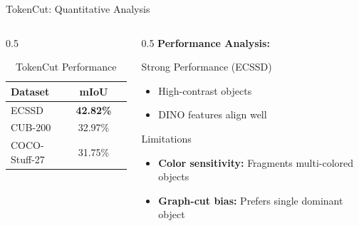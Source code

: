 \documentclass[aspectratio=169]{beamer}
\begin{document}
\begin{frame}{TokenCut: Quantitative Analysis}
\begin{columns}
\begin{column}{0.5\textwidth}
\begin{table}
\centering
\begin{tabular}{lcc}
\toprule
\textbf{Dataset} & \textbf{mIoU} \\
\midrule
ECSSD & \textbf{42.82\%} \\
CUB-200 & 32.97\% \\
COCO-Stuff-27 & 31.75\%  \\
\bottomrule
\end{tabular}
\caption{TokenCut Performance}
\end{table}


\end{column}

\begin{column}{0.5\textwidth}
\textbf{Performance Analysis:}

\begin{block}{Strong Performance (ECSSD)}
\begin{itemize}
    \item High-contrast objects
    \item DINO features align well
\end{itemize}
\end{block}



\begin{alertblock}{Limitations}
\begin{itemize}
    \item \textbf{Color sensitivity:} Fragments multi-colored objects
    \item \textbf{Graph-cut bias:} Prefers single dominant object
\end{itemize}
\end{alertblock}
\end{column}
\end{columns}
\end{frame}

\end{document}
